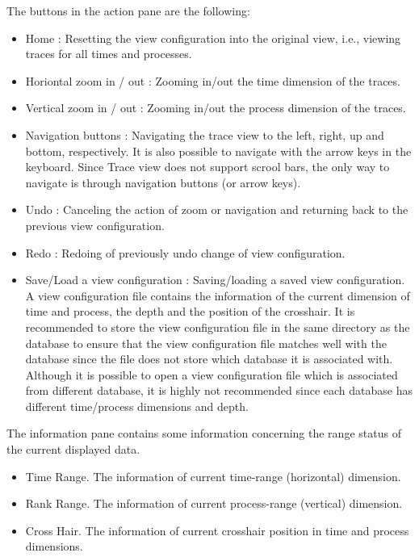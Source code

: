 \documentclass[english]{article}
\begin{document}
The buttons in the action pane are the following:
\begin{itemize}

\item Home : Resetting the view configuration into the original view, i.e., viewing traces for all times and processes.
\item Horiontal zoom in / out : Zooming in/out the time dimension of the traces.
\item Vertical zoom in / out : Zooming in/out the process dimension of the traces.
\item Navigation buttons : Navigating the trace view to the left, right, up and bottom, respectively. It is also possible to navigate with the arrow keys in the keyboard. Since Trace view does not support scrool bars, the only way to navigate is through navigation buttons (or arrow keys).
\item Undo : Canceling the action of zoom or navigation and returning back to the previous view configuration.
\item Redo : Redoing of previously undo change of view configuration.
\item Save/Load a view configuration : Saving/loading a saved view configuration.
A view configuration file contains the information of the current dimension of time and process, the depth and the position of the crosshair.
It is recommended to store the view configuration file in the same directory as the database to ensure that the view configuration file matches well with the database since the file does not store which database it is associated with.
Although it is possible to open a view configuration file which is associated from different database, it is highly not recommended since each database has different time/process dimensions and depth.


\end{itemize}

The information pane contains some information concerning the range status of the current displayed data.
\begin{itemize}
 \item Time Range. The information of current time-range (horizontal) dimension.
 \item Rank Range. The information of current process-range (vertical) dimension.
 \item Cross Hair. The information of current crosshair position in time and process dimensions.
\end{itemize}
\end{document}
